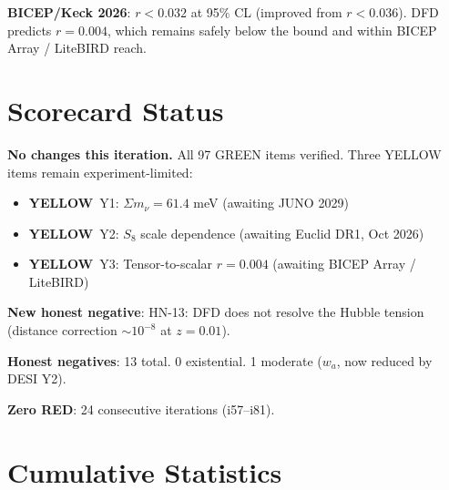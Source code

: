 \documentclass[11pt,a4paper]{article}
\newcommand{\YELLOW}{\textcolor{dfdyellow}{\textbf{YELLOW}}}
\begin{document}
\textbf{BICEP/Keck 2026}: $r < 0.032$ at 95\% CL (improved from $r < 0.036$). DFD predicts $r = 0.004$, which remains safely below the bound and within BICEP Array / LiteBIRD reach.

\section{Scorecard Status}

\begin{tcolorbox}[colback=green!5!white, colframe=dfdgreen, title=\textbf{Scorecard: 97 GREEN / 3 YELLOW / 0 RED}]

\textbf{No changes this iteration.} All 97 GREEN items verified. Three YELLOW items remain experiment-limited:

\begin{itemize}[nosep]
\item \YELLOW\ Y1: $\Sigma m_\nu = 61.4$ meV (awaiting JUNO 2029)
\item \YELLOW\ Y2: $S_8$ scale dependence (awaiting Euclid DR1, Oct 2026)
\item \YELLOW\ Y3: Tensor-to-scalar $r = 0.004$ (awaiting BICEP Array / LiteBIRD)
\end{itemize}

\textbf{New honest negative}: HN-13: DFD does not resolve the Hubble tension (distance correction $\sim 10^{-8}$ at $z = 0.01$).

\textbf{Honest negatives}: 13 total. 0 existential. 1 moderate ($w_a$, now reduced by DESI Y2).

\textbf{Zero RED}: 24 consecutive iterations (i57--i81).
\end{tcolorbox}

\section{Cumulative Statistics}
\end{document}
